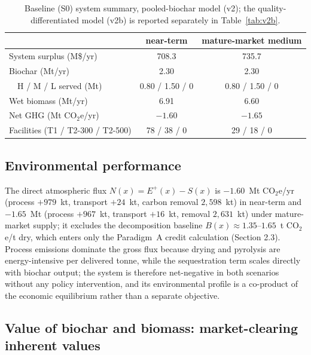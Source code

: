 \begin{table}[htbp]
\centering
\caption{\small Baseline (S0) system summary, pooled-biochar model (v2); the
quality-differentiated model (v2b) is reported separately in
Table~\ref{tab:v2b}.}
\label{tab:s0}
\begin{tabular}{lcc}
\toprule
 & near-term & mature-market medium\\
\midrule
System surplus (M\$/yr) & 708.3 & 735.7\\
Biochar (Mt/yr) & 2.30 & 2.30\\
\ \ H / M / L served (Mt) & 0.80 / 1.50 / 0 & 0.80 / 1.50 / 0\\
Wet biomass (Mt/yr) & 6.91 & 6.60\\
Net GHG (Mt CO$_2$e/yr) & $-1.60$ & $-1.65$\\
Facilities (T1 / T2-300 / T2-500) & 78 / 38 / 0 & 29 / 18 / 0\\
\bottomrule
\end{tabular}
\end{table}

\FloatBarrier

\subsection{Environmental performance}

The direct atmospheric flux $N(x)=E^{+}(x)-S(x)$ is $-1.60$~Mt CO$_2$e/yr
(process $+979$~kt, transport $+24$~kt, carbon removal $2{,}598$~kt) in
near-term and $-1.65$~Mt (process $+967$~kt, transport $+16$~kt, removal
$2{,}631$~kt) under mature-market supply; it excludes
the decomposition baseline $B(x)\approx 1.35$--$1.65$~t CO$_2$e/t dry, which
enters only the Paradigm~A credit calculation (Section 2.3). Process emissions
dominate the gross flux because drying and pyrolysis are energy-intensive per
delivered tonne, while the sequestration term scales directly with biochar
output; the system is therefore net-negative in both scenarios without any
policy intervention, and its environmental profile is a co-product of the
economic equilibrium rather than a separate objective.

\subsection{Value of biochar and biomass: market-clearing inherent values}

